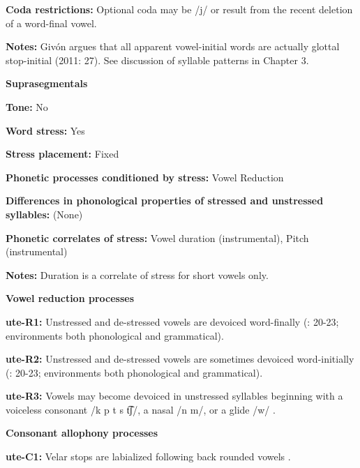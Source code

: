 \textbf{Coda restrictions:} Optional coda may be /j/ or result from the recent deletion of a word-final vowel. 



\textbf{Notes:} Givón argues that all apparent vowel-initial words are actually glottal stop-initial (2011: 27). See discussion of syllable patterns in Chapter 3.



\textbf{Suprasegmentals}



\textbf{Tone:} No



\textbf{Word stress:} Yes



\textbf{Stress placement:} Fixed



\textbf{Phonetic processes conditioned by stress:} Vowel Reduction



\textbf{Differences in phonological properties of stressed and unstressed syllables:} (None)



\textbf{Phonetic correlates of stress:} Vowel duration (instrumental), Pitch (instrumental)



\textbf{Notes:} Duration is a correlate of stress for short vowels only.



\textbf{Vowel reduction processes}



\textbf{ute-R1:} Unstressed and de-stressed vowels are devoiced word-finally (\citealt{Givón2011}: 20-23; environments both phonological and grammatical).



\textbf{ute-R2:} Unstressed and de-stressed vowels are sometimes devoiced word-initially (\citealt{Givón2011}: 20-23; environments both phonological and grammatical).



\textbf{ute-R3:} Vowels may become devoiced in unstressed syllables beginning with a voiceless consonant /k p t s t͡ʃ/, a nasal /n m/, or a glide /w/ \citep[21]{Givón2011}.



\textbf{Consonant allophony processes}



\textbf{ute-C1:} Velar stops are labialized following back rounded vowels \citep[29]{Givón2011}.



